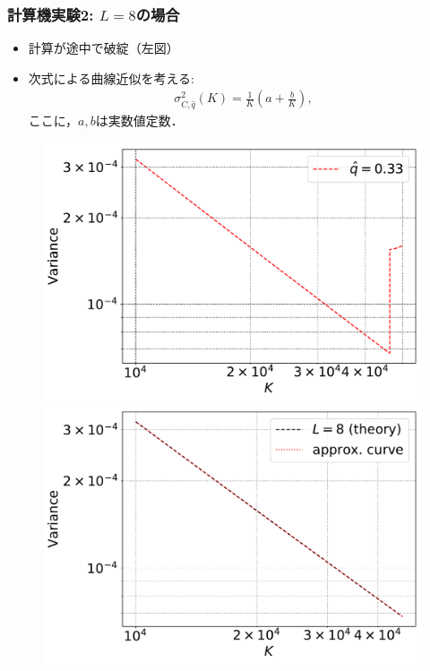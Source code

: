 \documentclass[dvipdfmx,11pt]{beamer}
\begin{document}
\begin{frame}[c]\frametitle{計算機実験2: $L=8$の場合}
\begin{itemize}
  \item 計算が途中で破綻（左図）
  \item 次式による曲線近似を考える:
  \begin{align*}
  \sigma_{C,\hat{q}}^2 (K) = \frac{1}{K} \left( a + \frac{b}{K} \right),
\end{align*}
ここに，$a,b$は実数値定数．
\end{itemize}
%
%
\centering
%
\begin{figure}[h]
 \begin{minipage}{0.49\hsize}
  \begin{center}
   \includegraphics[width=.95\linewidth]{./figure/hatan.pdf}
  \end{center}
 \end{minipage}
 \begin{minipage}{0.49\hsize}
  \begin{center}
   \includegraphics[width=.95\linewidth]{./figure/approx_varf_log_L8_10000.pdf}

\end{center}
\end{minipage}
\end{figure}
\end{frame}
\end{document}
